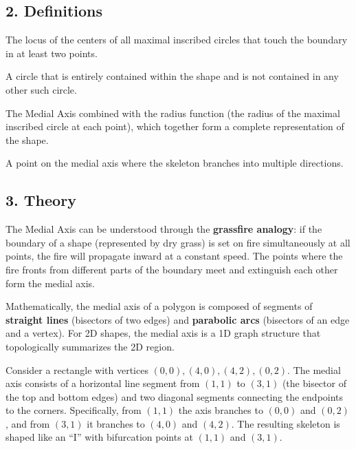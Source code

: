 \subsection{2. Definitions}

\begin{definition}\label{def:medial_axis}
The locus of the centers of all maximal inscribed circles that touch the boundary in at least two points.
\end{definition}

\begin{definition}\label{def:maximal_inscribed_circle}
A circle that is entirely contained within the shape and is not contained in any other such circle.
\end{definition}

\begin{definition}\label{def:mat}
The Medial Axis combined with the radius function (the radius of the maximal inscribed circle at each point), which together form a complete representation of the shape.
\end{definition}

\begin{definition}\label{def:bifurcation_point}
A point on the medial axis where the skeleton branches into multiple directions.
\end{definition}

\subsection{3. Theory}

The Medial Axis can be understood through the \textbf{grassfire analogy}\cite{blum1967}: if the boundary of a shape (represented by dry grass) is set on fire simultaneously at all points, the fire will propagate inward at a constant speed. The points where the fire fronts from different parts of the boundary meet and extinguish each other form the medial axis.

Mathematically, the medial axis of a polygon is composed of segments of \textbf{straight lines} (bisectors of two edges) and \textbf{parabolic arcs} (bisectors of an edge and a vertex). For 2D shapes, the medial axis is a 1D graph structure that topologically summarizes the 2D region.

\begin{example}\label{ex:medial_axis_rectangle}
Consider a rectangle with vertices $(0,0), (4,0), (4,2), (0,2)$. The medial axis consists of a horizontal line segment from $(1,1)$ to $(3,1)$ (the bisector of the top and bottom edges) and two diagonal segments connecting the endpoints to the corners. Specifically, from $(1,1)$ the axis branches to $(0,0)$ and $(0,2)$, and from $(3,1)$ it branches to $(4,0)$ and $(4,2)$. The resulting skeleton is shaped like an ``I'' with bifurcation points at $(1,1)$ and $(3,1)$.
\end{example}

